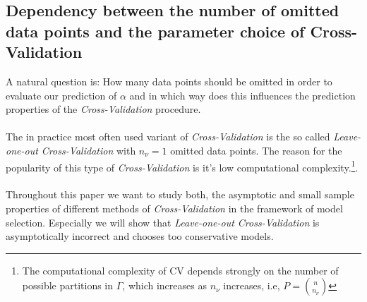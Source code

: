 \documentclass[Research_Module_ES.tex]{subfiles}
\begin{document}
\subsection{Dependency between the number of omitted data points and the  parameter choice of Cross-Validation}
A natural question is: How many data points should be omitted in order to evaluate our prediction of $\alpha$ and in which way does this influences the prediction properties of the \textit{Cross-Validation} procedure.\\
\\
The in practice most often used variant of \textit{Cross-Validation} is the so called \textit{ Leave-one-out Cross-Validation} with $n_\nu=1$ omitted data points. The reason for the popularity of this type of \textit{Cross-Validation} is it's low computational complexity.\footnote{The computational complexity of CV depends strongly on the number of possible partitions in $\Gamma$, which increases as $n_\nu$ increases, i.e,
$P=\binom{n}{n_\nu}$}.\\
\\
Throughout this paper we want to study both, the asymptotic and small sample properties of different methods of \textit{Cross-Validation} in the framework of model selection. Especially we will show that \textit{ Leave-one-out Cross-Validation} is asymptotically incorrect and chooses too conservative models.\\
\end{document}
